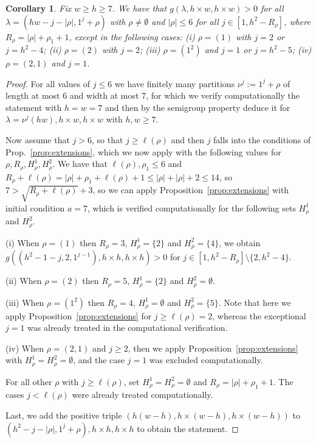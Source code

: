 \documentclass{article}
\numberwithin{equation}{section}
\newtheorem{corollary}[equation]{Corollary}
\theoremstyle{definition}
\begin{document}
\begin{corollary}\label{cor:columns1246}
Fix $w \geq h  \geq 7 $. We have that $g(\lambda,h \times w, h\times w) >0$ for all $\lambda = ( hw  - j-|\rho|, 1^j + \rho)$ with
$\rho \neq \emptyset$ and $|\rho| \leq 6$ 
for all $j \in [ 1, h^2 - R_\rho]$, where $R_\rho = |\rho|+\rho_1+1$, except in the following cases:
(i) $\rho = (1)$ with $j=2$ or $j=h^2-4$;
(ii) $\rho=(2)$ with $j=2$;
(iii) $\rho =(1^2)$ and $j=1$ or $j=h^2-5$; 
(iv) $\rho=(2,1)$ and $j=1$.
\end{corollary}
\begin{proof}
For all values of $j \leq 6$ we have finitely many partitions $\nu^j := 1^j+ \rho$ of length at most 6 and width at most 7, for which we verify computationally the statement with $h=w=7$ and then by the semigroup property deduce it for $\lambda=\nu^j(hw) , h \times w, h \times w$ with $h,w \geq 7$. 

Now assume that $j>6$, so that $j \geq \ell(\rho)$ and then $j$ falls into the conditions of  Prop.~\ref{prop:extensions}, which we now apply with the following values for $\rho, R_{\rho}, H^1_\rho, H^2_\rho$. 
We have that $\ell(\rho),\rho_1 \leq 6$ and   $R_\rho +\ell(\rho)= |\rho| + \rho_1 +\ell(\rho)+1 \leq |\rho| + |\rho|+2 \leq 14$, so $7>\sqrt{R_\rho+\ell(\rho)} +3$, so we can apply Proposition~\ref{prop:extensions} with initial condition $a=7$, which is verified computationally for the following sets $H^1_\rho$ and $H^2_\rho$. 

(i) When $\rho=(1)$ then $R_\rho = 3$, $H^1_{\rho} = \{2\}$ and $H^2_{\rho} =\{4\}$, we obtain $g( (h^2 -1 - j, 2,1^{j-1}), h \times h, h \times h)>0$ for $j\in [1, h^2-R_\rho] \setminus \{2, h^2 - 4\}$.

(ii) When $\rho=(2)$ then $R_\rho = 5$,
 $H^1_{\rho} =\{2\}$ and $H^2_{\rho} = \emptyset$.

(iii) When $\rho = (1^2)$ then $R_\rho = 4$, $H^1_{\rho} = \emptyset$ and $H^2_\rho = \{5\}$. Note that here we apply Proposition~\ref{prop:extensions} for $j \geq \ell(\rho)=2$, whereas the exceptional $j=1$ was already treated in the computational verification.  

(iv) When $\rho=(2,1)$ and $j\geq 2$, then we apply Proposition~\ref{prop:extensions} with $H^1_\rho=H^2_\rho= \emptyset$, and the case $j=1$ was excluded computationally. 

For all other $\rho$ with $j\geq \ell(\rho)$,  set $H^1_{\rho} = H^2_\rho =\emptyset$ and $R_\rho = |\rho|+\rho_1+1$. The cases $j<\ell(\rho)$ were already treated computationally.

Last, we add the positive triple $(h(w-h), h \times (w-h), h \times (w-h))$ to  $ ( h^2  - j-|\rho|, 1^j+\rho ), h \times h, h \times h$ to obtain the statement. 
\end{proof}
\end{document}
